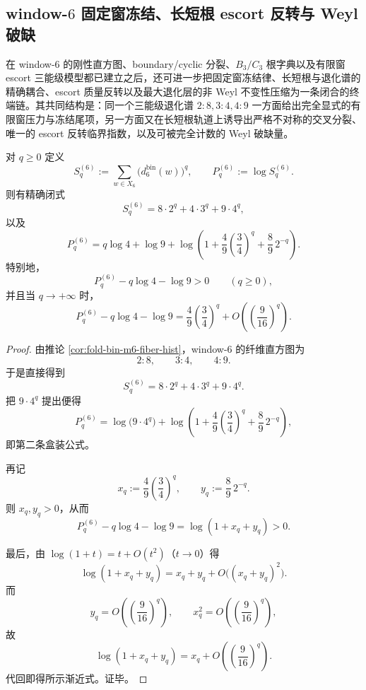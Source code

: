 \subsection{window-\texorpdfstring{$6$}{6} 固定窗冻结、长短根 escort 反转与 Weyl 破缺}\label{subsec:conclusion-window6-fixedfreezing-shortlong-escort-weyl}
在 window-\(6\) 的刚性直方图、boundary/cyclic 分裂、\(B_3/C_3\) 根字典以及有限窗 escort 三能级模型都已建立之后，还可进一步把固定窗冻结律、长短根与退化谱的精确耦合、escort 质量反转以及最大退化层的非 Weyl 不变性压缩为一条闭合的终端链。其共同结构是：同一个三能级退化谱 \(2:8,3:4,4:9\) 一方面给出完全显式的有限窗压力与冻结尾项，另一方面又在长短根轨道上诱导出严格不对称的交叉分裂、唯一的 escort 反转临界指数，以及可被完全计数的 Weyl 破缺量。

\begin{theorem}\label{thm:conclusion-window6-fixed-window-freezing-closed}
对 \(q\ge 0\) 定义
\[
S_q^{(6)}
:=
\sum_{w\in X_6}\bigl(d_6^{\mathrm{bin}}(w)\bigr)^q,
\qquad
P_q^{(6)}:=\log S_q^{(6)}.
\]
则有精确闭式
\[
\boxed{\;
S_q^{(6)}=8\cdot 2^q+4\cdot 3^q+9\cdot 4^q,\;}
\]
以及
\[
\boxed{\;
P_q^{(6)}
=
q\log 4+\log 9
+\log\!\left(
1+\frac49\left(\frac34\right)^q+\frac89\,2^{-q}
\right).\;}
\]
特别地，
\[
\boxed{\;
P_q^{(6)}-q\log 4-\log 9>0\qquad(q\ge 0),\;}
\]
并且当 \(q\to+\infty\) 时，
\[
\boxed{\;
P_q^{(6)}-q\log 4-\log 9
=
\frac49\left(\frac34\right)^q
+O\!\left(\left(\frac{9}{16}\right)^q\right).\;}
\]
\end{theorem}
\begin{proof}
由推论 \ref{cor:fold-bin-m6-fiber-hist}，window-\(6\) 的纤维直方图为
\[
2:8,\qquad 3:4,\qquad 4:9.
\]
于是直接得到
\[
S_q^{(6)}=8\cdot 2^q+4\cdot 3^q+9\cdot 4^q.
\]
把 \(9\cdot 4^q\) 提出便得
\[
P_q^{(6)}
=
\log\!\bigl(9\cdot 4^q\bigr)
+\log\!\left(
1+\frac49\left(\frac34\right)^q+\frac89\,2^{-q}
\right),
\]
即第二条盒装公式。

再记
\[
x_q:=\frac49\left(\frac34\right)^q,
\qquad
y_q:=\frac89\,2^{-q}.
\]
则 \(x_q,y_q>0\)，从而
\[
P_q^{(6)}-q\log 4-\log 9=\log(1+x_q+y_q)>0.
\]

最后，由 \(\log(1+t)=t+O(t^2)\)（\(t\to 0\)）得
\[
\log(1+x_q+y_q)=x_q+y_q+O\bigl((x_q+y_q)^2\bigr).
\]
而
\[
y_q=O\!\left(\left(\frac{9}{16}\right)^q\right),
\qquad
x_q^2=O\!\left(\left(\frac{9}{16}\right)^q\right),
\]
故
\[
\log(1+x_q+y_q)
=
x_q+O\!\left(\left(\frac{9}{16}\right)^q\right).
\]
代回即得所示渐近式。证毕。
\end{proof}

